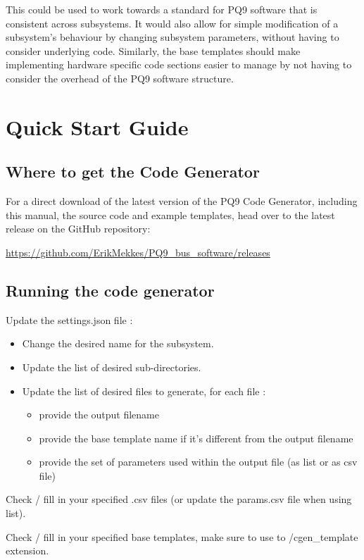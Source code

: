 \documentclass{settings/TU_Delft_Report}
\begin{document}
\vsp This could be used to work towards a standard for PQ9 software that is consistent across subsystems. It would also allow for simple modification of a subsystem's behaviour by changing subsystem parameters, without having to consider underlying code. Similarly, the base templates should make implementing hardware specific code sections easier to manage by not having to consider the overhead of the PQ9 software structure.

\chapter{Quick Start Guide}

\section{Where to get the Code Generator}
For a direct download of the latest version of the PQ9 Code Generator, including this manual, the source code and example templates, head over to the latest release on the GitHub repository:\vsp


\url{https://github.com/ErikMekkes/PQ9_bus_software/releases}

\section{Running the code generator}
Update the settings.json file :
\begin{itemize}
\item Change the desired name for the subsystem.
\item Update the list of desired sub-directories.
\item Update the list of desired files to generate, for each file :
\begin{itemize}
    \item provide the output filename
    \item provide the base template name if it's different from the output filename
    \item provide the set of parameters used within the output file (as list or as csv file)
\end{itemize}
\end{itemize}

\vsp Check / fill in your specified .csv files (or update the params.csv file when using list).

\vsp Check / fill in your specified base templates, make sure to use to /cgen\_template extension.
\end{document}
